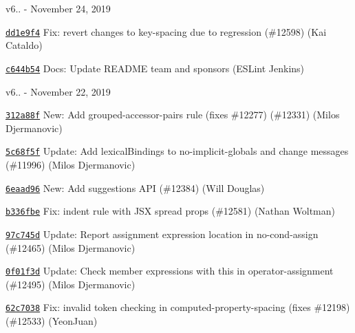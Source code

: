 v6.. -\/ November 24, 2019


\begin{DoxyItemize}
\item \href{https://github.com/eslint/eslint/commit/dd1e9f4df2103c43509a54b0ad5f9106557997f9}{\texttt{ {\ttfamily dd1e9f4}}} Fix\+: revert changes to key-\/spacing due to regression (\#12598) (Kai Cataldo)
\item \href{https://github.com/eslint/eslint/commit/c644b5429e5bc8a050afd70c99ec82035eb611fa}{\texttt{ {\ttfamily c644b54}}} Docs\+: Update README team and sponsors (ESLint Jenkins)
\end{DoxyItemize}

v6.. -\/ November 22, 2019


\begin{DoxyItemize}
\item \href{https://github.com/eslint/eslint/commit/312a88f2230082d898b7d8d82f8af63cb352e55a}{\texttt{ {\ttfamily 312a88f}}} New\+: Add grouped-\/accessor-\/pairs rule (fixes \#12277) (\#12331) (Milos Djermanovic)
\item \href{https://github.com/eslint/eslint/commit/5c68f5feeb4a6c0cb53ff76b2fd255b5bfa69c93}{\texttt{ {\ttfamily 5c68f5f}}} Update\+: Add \textquotesingle{}lexical\+Bindings\textquotesingle{} to no-\/implicit-\/globals and change messages (\#11996) (Milos Djermanovic)
\item \href{https://github.com/eslint/eslint/commit/6eaad964ff159d0a38de96c1104782ffe6858c78}{\texttt{ {\ttfamily 6eaad96}}} New\+: Add suggestions API (\#12384) (Will Douglas)
\item \href{https://github.com/eslint/eslint/commit/b336fbedecd85731611fdc2dfd8edb635a8b1c39}{\texttt{ {\ttfamily b336fbe}}} Fix\+: indent rule with JSX spread props (\#12581) (Nathan Woltman)
\item \href{https://github.com/eslint/eslint/commit/97c745dc277febbea82552a4d9186e3df847f860}{\texttt{ {\ttfamily 97c745d}}} Update\+: Report assignment expression location in no-\/cond-\/assign (\#12465) (Milos Djermanovic)
\item \href{https://github.com/eslint/eslint/commit/0f01f3d0807c580631c2fdcff29192a64a870637}{\texttt{ {\ttfamily 0f01f3d}}} Update\+: Check member expressions with {\ttfamily this} in operator-\/assignment (\#12495) (Milos Djermanovic)
\item \href{https://github.com/eslint/eslint/commit/62c7038a493d89e4a7b14ac673a063d09d04057b}{\texttt{ {\ttfamily 62c7038}}} Fix\+: invalid token checking in computed-\/property-\/spacing (fixes \#12198) (\#12533) (Yeon\+Juan)

\end{DoxyItemize}
